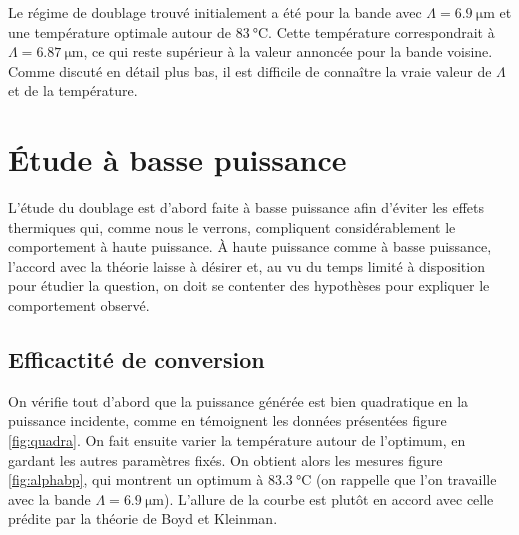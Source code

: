 \documentclass[11pt,a4paper] { article}
\begin{document}



Le régime de doublage trouvé initialement a été pour la bande avec $\Lambda = \SI{6.9}{\micro\meter}$ et une température optimale autour de $\SI{83}{\celsius}$. Cette température correspondrait à $\Lambda=\SI{6.87}{\micro\meter}$, ce qui reste supérieur à la valeur annoncée pour la bande voisine. Comme discuté en détail plus bas, il est difficile de connaître la vraie valeur de $\Lambda$ et de la température.

\section{Étude à basse puissance}

L'étude du doublage est d'abord faite à basse puissance afin d'éviter les effets thermiques qui, comme nous le verrons, compliquent considérablement le comportement à haute puissance. À haute puissance comme à basse puissance, l'accord avec la théorie laisse à désirer et, au vu du temps limité à disposition pour étudier la question, on doit se contenter des hypothèses pour expliquer le comportement observé.

\subsection{Efficactité de conversion} 

On vérifie tout d'abord que la puissance générée est bien quadratique en la puissance incidente, comme en témoignent les données présentées figure \ref{fig:quadra}. On fait ensuite varier la température autour de l'optimum, en gardant les autres paramètres fixés. On obtient alors les mesures figure \ref{fig:alphabp}, qui montrent un optimum à $\SI{83.3}{\celsius}$ (on rappelle que l'on travaille avec la bande $\Lambda = \SI{6.9}{\micro\meter}$). L'allure de la courbe est plutôt en accord avec celle prédite par la théorie de Boyd et Kleinman. 
\end{document}
